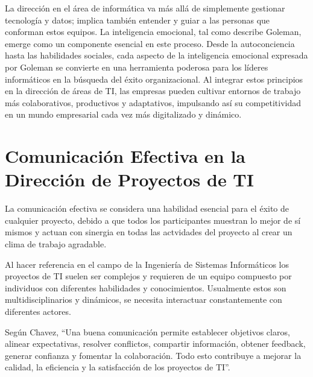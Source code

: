 \documentclass[journal]{IEEEtran}
\begin{document}
La dirección en el área de informática va más allá de simplemente gestionar tecnología y datos; implica también entender y guiar a las personas que conforman estos equipos. La inteligencia emocional, tal como describe Goleman, emerge como un componente esencial en este proceso. Desde la autoconciencia hasta las habilidades sociales, cada aspecto de la inteligencia emocional expresada por Goleman se convierte en una herramienta poderosa para los líderes informáticos en la búsqueda del éxito organizacional. Al integrar estos principios en la dirección de áreas de TI, las empresas pueden cultivar entornos de trabajo más colaborativos, productivos y adaptativos, impulsando así su competitividad en un mundo empresarial cada vez más digitalizado y dinámico.

\section{Comunicación Efectiva en la Dirección de Proyectos de TI}
La comunicación efectiva se considera una habilidad esencial para el éxito de cualquier proyecto, debido a que todos los participantes muestran lo mejor de sí mismos y actuan con sinergia en todas las actvidades del proyecto al crear un clima de trabajo agradable. 

Al hacer referencia en el campo de la Ingeniería de Sistemas Informáticos los proyectos de TI suelen ser complejos y requieren de un equipo compuesto por individuos con diferentes habilidades y conocimientos. Usualmente estos son multidisciplinarios y dinámicos, se necesita interactuar constantemente con diferentes actores.

Según Chavez, “Una buena comunicación permite establecer objetivos claros, alinear expectativas, resolver conflictos, compartir información, obtener feedback, generar confianza y fomentar la colaboración. Todo esto contribuye a mejorar la calidad, la eficiencia y la satisfacción de los proyectos de TI”.
\end{document}
